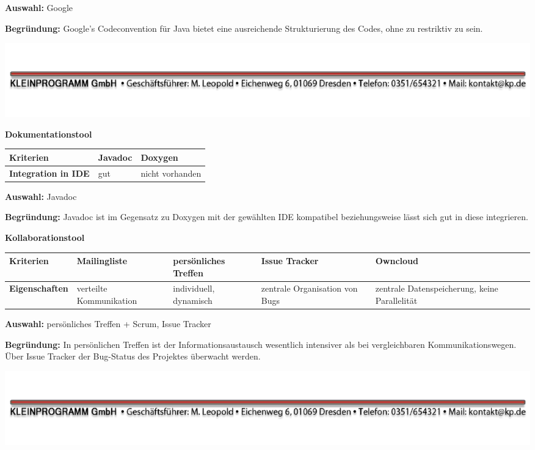 \documentclass[12pt]{article}
\begin{document}
\textbf{Auswahl:} Google

\textbf{Begründung:} Google's Codeconvention für Java bietet eine ausreichende Strukturierung des Codes, ohne zu restriktiv zu sein.

\vspace*{30mm}
\vspace*{\fill}
\includegraphics[scale=0.9]{footer.pdf}
\thispagestyle{empty}




\textbf{Dokumentationstool}

\begin{tabularx}{\textwidth}{|X|X|X|}\hline
 \textbf{Kriterien}&\textbf{Javadoc}&\textbf{Doxygen}\\ \hline
 \textbf{Integration in IDE}&gut&nicht vorhanden\\ \hline
\end{tabularx}

\vspace*{3mm}

\textbf{Auswahl:} Javadoc

\textbf{Begründung:} Javadoc ist im Gegensatz zu Doxygen mit der gewählten IDE kompatibel beziehungsweise lässt sich gut in diese integrieren.
 \vspace*{10mm}

\textbf{Kollaborationstool}

\begin{tabularx}{\textwidth}{|X|X|X|X|X|}\hline
 \textbf{Kriterien}&\textbf{Mailingliste}&\textbf{persönliches Treffen}&\textbf{Issue Tracker}&\textbf{Owncloud}\\ \hline
 \textbf{Eigenschaften}&verteilte Kommunikation&individuell, dynamisch&zentrale Organisation von Bugs&zentrale Datenspeicherung, keine Parallelität\\ \hline
\end{tabularx}

\vspace*{3mm}

\textbf{Auswahl:} persönliches Treffen + Scrum, Issue Tracker

\textbf{Begründung:} In persönlichen Treffen ist der Informationsaustausch wesentlich intensiver als bei vergleichbaren Kommunikationswegen. Über Issue Tracker der Bug-Status des Projektes überwacht werden.


\vspace*{\fill}
\includegraphics[scale=0.9]{footer.pdf}
\thispagestyle{empty}
\end{document}
